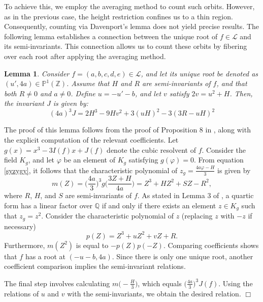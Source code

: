 \documentclass{article}
\newtheorem{lemma}[theorem]{Lemma}
\newenvironment{proof}{\noindent {\bf Proof:}}{$\Box$ \vspace{2 ex}}
\begin{document}
To achieve this, we employ the averaging method to count such orbits. However, as in the previous case, the height restriction confines us to a thin region. Consequently, counting via Davenport’s lemma does not yield precise results. The following lemma establishes a connection between the unique root of $f \in \mathcal{L}$ and its semi-invariants. This connection allows us to count these orbits by fibering over each root after applying the averaging method.


\begin{lemma}\label{J-single root lemma}
Consider $f = (a, b, c, d, e) \in \mathcal{L}$, and let its unique root be denoted as $(u', 4a) \in \mathbb{P}^1(\mathbb{Z})$. Assume that $H$ and $R$ are semi-invariants of $f$, and that both $R \neq 0$ and $a \neq 0$. Define $u = -u' - b$, and let $v$ satisfy $2v = u^2 + H$. Then, the invariant $J$ is given by:
\begin{equation}\label{J-single root}
(4a)^3J = 2H^3-9Hv^2+3(uH)^2-3(3R-uH)^2
\end{equation}
\end{lemma}
\begin{proof}
The proof of this lemma follows from the proof of Proposition 8 in \cite{cremona1}, along with the explicit computation of the relevant coefficients. Let $g(x) = x^3 - 3I(f)x + J(f)$ denote the cubic resolvent of $f$. Consider the field $K_g$, and let $\varphi$ be an element of $K_g$ satisfying $g(\varphi) = 0$. From equation \eqref{syzygy}, it follows that the characteristic polynomial of  
$z_g = \frac{4a\varphi - H}{3}$  
is given by  
\begin{equation*}
m(Z) = \Big(\frac{4a}{3}\Big)^3 g\Big(\frac{3Z+H}{4a}\Big) = Z^3 + HZ^2 + SZ - R^2,
\end{equation*}  
where $R$, $H$, and $S$ are semi-invariants of $f$. As stated in Lemma 3 of \cite{cremona1}, a quartic form has a linear factor over $\mathbb{Q}$ if and only if there exists an element $z \in K_g$ such that $z_g = z^2$. Consider the characteristic polynomial of $z$ (replacing $z$ with $-z$ if necessary)
\begin{equation*}
p(Z) = Z^3 + uZ^2 + vZ + R.
\end{equation*}  
Furthermore, $m(Z^2)$ is equal to $-p(Z)p(-Z)$. Comparing coefficients shows that $f$ has a root at $(-u - b, 4a)$. Since there is only one unique root, another coefficient comparison implies the semi-invariant relations.  

The final step involves calculating $m\big(-\frac{H}{3}\big)$, which equals $\big(\frac{4a}{3}\big)^3 J(f)$. Using the relations of $u$ and $v$ with the semi-invariants, we obtain the desired relation.
\end{proof}
\end{document}
